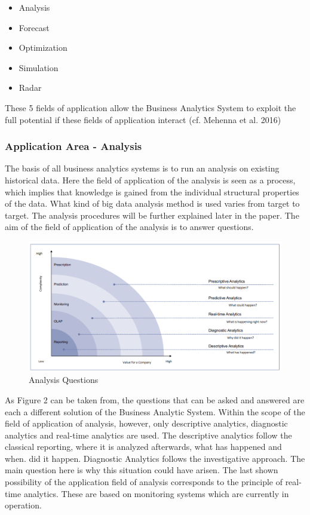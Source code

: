 \documentclass[12pt,twocolumn,twoside]{conference}   %
\begin{document}
\begin{itemize}
\item Analysis
\item Forecast
\item Optimization
\item Simulation
\item Radar
\end{itemize}

These 5 fields of application allow the Business Analytics System to exploit the full potential if these fields of application interact (cf. Mehenna et al. 2016) 

\subsubsection{Application Area - Analysis}
The basis of all business analytics systems is to run an analysis on existing historical data. Here the field of application of the analysis is seen as a process, which implies that knowledge is gained from the individual structural properties of the data. What kind of big data analysis method is used varies from target to target. The analysis procedures will be further explained later in the paper. The aim of the field of application of the analysis is to answer questions. 

\begin{@twocolumnfalse}
\begin{figure}[H]
\centering
\includegraphics[width=20cm]{Abbildungen/Analysis.png}
\caption{Analysis Questions}\label{visina8}
\end{figure}
\end{@twocolumnfalse}

As Figure 2 can be taken from, the questions that can be asked and answered are each a different solution of the Business Analytic System. Within the scope of the field of application of analysis, however, only descriptive analytics, diagnostic analytics and real-time analytics are used. The descriptive analytics follow the classical reporting, where it is analyzed afterwards, what has happened and when. did it happen. Diagnostic Analytics follows the investigative approach. The main question here is why this situation could have arisen. The last shown possibility of the application field of analysis corresponds to the principle of real-time analytics. These are based on monitoring systems which are currently in operation. 
\end{document}
